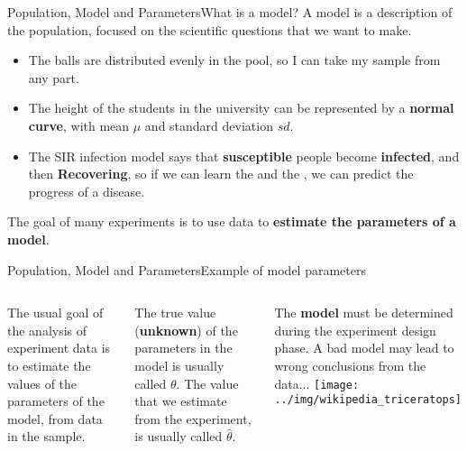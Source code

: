 \begin{frame}{Population, Model and Parameters}{What is a model?}
  A model is a description of the population, focused on the scientific questions that we want to make.\bigskip

  \begin{itemize}
    \item The balls are distributed evenly in the pool, so I can take my sample from any part.
    \item The height of the students in the university can be represented by a {\bf normal curve}, with mean $\mu$ and standard deviation $sd$.
    \item The SIR infection model says that {\bf susceptible} people become {\bf infected}, and then {\bf Recovering}, so if we can learn the  and the , we can predict the progress of a disease.
  \end{itemize}\bigskip

  The goal of many experiments is to use data to {\bf estimate the parameters of a model}.
\end{frame}

\begin{frame}{Population, Model and Parameters}{Example of model parameters}
  \begin{columns}
      The usual goal of the analysis of experiment data is to estimate the
      values of the parameters of the model, from data in the sample.\bigskip

      The true value ({\bf unknown}) of the parameters in the model is usually called $\theta$. The value that we estimate from the experiment, is usually called $\hat{\theta}$.\bigskip

      The {\bf model} must be determined during the experiment design phase.
      A bad model may lead to wrong conclusions from the data...
    \texttt{[image: ../img/wikipedia\_triceratops]}
  \end{columns}
\end{frame}



